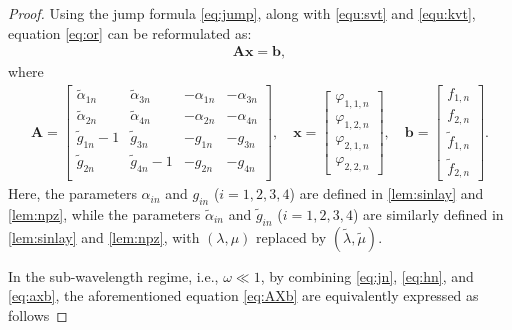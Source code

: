 \documentclass[11pt,reqno,twoside]{amsart}
\theoremstyle{definition}
\theoremstyle{remark}
\numberwithin{equation}{section}
\begin{document}
\begin{proof}
	Using the jump formula \eqref{eq:jump}, along with \eqref{equ:svt} and \eqref{equ:kvt}, equation \eqref{eq:or} can be reformulated as:
	\begin{align}\label{eq:AXb}\bm{Ax}=\bm{b},\end{align}
	where
	\begin{align}\label{eq:axb}
		\bm{A}=\begin{bmatrix}
			\tilde{\alpha}_{1n} & \tilde{\alpha}_{3n} & -\alpha_{1n} & -\alpha_{3n} \\
			\tilde{\alpha}_{2n} & \tilde{\alpha}_{4n} & -\alpha_{2n} & -\alpha_{4n} \\
			\tilde{g}_{1n}-1 & \tilde{g}_{3n} & -g_{1n} & -g_{3n} \\
			\tilde{g}_{2n} & \tilde{g}_{4n}-1 & -g_{2n} & -g_{4n} \\
		\end{bmatrix},\quad
		\bm{x}=\begin{bmatrix}\varphi _{1,1,n} 
			\\\varphi _{1,2,n} 
			\\\varphi _{2,1,n} 
			\\\varphi _{2,2,n} 		
		\end{bmatrix},
		\quad
		\bm{b}=\begin{bmatrix}f _{1,n} 
			\\f _{2,n}  
			\\\tilde{f}_{1,n} 
			\\\tilde{f}_{2,n}  
		\end{bmatrix}.
	\end{align}
	Here, the parameters $\alpha_{in}$ and $g_{in}$ ($i = 1, 2, 3, 4$) are defined in \eqref{lem:sinlay} and \eqref{lem:npz}, while the parameters $\tilde{\alpha}_{in} $ and $\tilde{g}_{in}$  ($i = 1, 2, 3, 4$) are similarly defined in \eqref{lem:sinlay} and \eqref{lem:npz}, with $(\lambda, \mu)$ replaced by $(\tilde{\lambda}, \tilde{\mu})$.
	
	In the sub-wavelength regime, i.e., $\omega \ll 1$, by combining \eqref{eq:jn}, \eqref{eq:hn}, and \eqref{eq:axb}, the aforementioned equation \eqref{eq:AXb} are equivalently expressed as follows
	

\end{proof}
\end{document}
